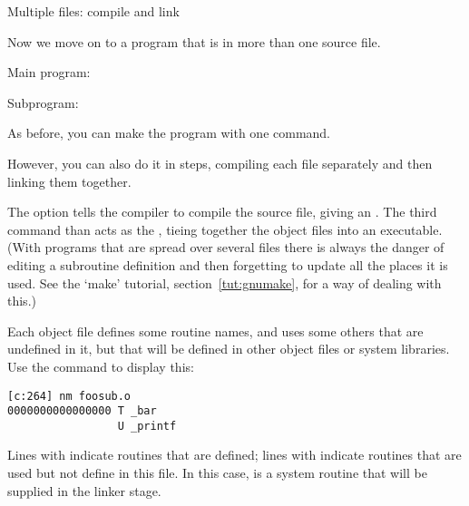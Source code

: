  {Multiple files: compile and link}

Now we move on to a program that is in more than one source file.

\begin{multicols}{2}
  Main program: 
  
  \columnbreak
  Subprogram: 
  
\end{multicols}

As before, you can make the program with one command.

\begin{comment}
\begin{verbatim}
clang -o oneprogram fooprog.c foosub.c
./oneprogram
hello world
\end{verbatim}
\end{comment}

However, you can also do it in steps, compiling each file separately
and then linking them together.


\begin{comment}
\begin{verbatim}
clang -c -fPIC fooprog.c
clang -c -fPIC foosub.c
clang -o oneprogram fooprog.o foosub.o
./oneprogram
hello world
\end{verbatim}
\end{comment}

The  option tells the compiler to compile the source file,
giving an . The third command than acts as the
, tieing together the object files into an
executable. (With programs that are spread over several files there is
always the danger of editing a subroutine definition and then
forgetting to update all the places it is used. See the `make'
tutorial, section~\ref{tut:gnumake}, for a way of dealing with this.) 

Each object file defines some routine names, and uses some others that
are undefined in it, but that will be defined in other object files or
system libraries. Use the  command to display
this:
\begin{verbatim}
[c:264] nm foosub.o
0000000000000000 T _bar
                 U _printf
\end{verbatim}
Lines with  indicate routines that are defined; lines with 
indicate routines that are used but not define in this file. In this
case,  is a system routine that will be supplied in the
linker stage.

